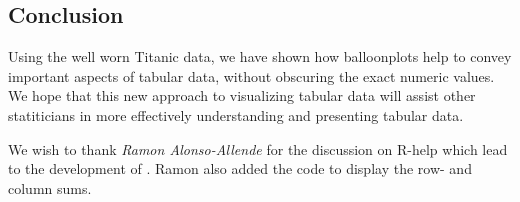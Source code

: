 \documentclass[a4paper]{report}
\begin{document}
\begin{article}
\section*{Conclusion}

Using the well worn Titanic data, we have shown how balloonplots
help to convey important aspects of tabular data, without obscuring
the exact numeric values. We hope that this new approach to
visualizing tabular data will assist other statiticians in more
effectively understanding and presenting tabular data.

We wish to thank \emph{Ramon Alonso-Allende}
 for the discussion on R-help which lead
to the development of . Ramon also added the code
to display the row- and column sums.

\address{Gregory R. Warnes, Pfizer Inc., USA\\
\\
       Nitin Jain, Pfizer Inc., USA\\
}

\end{article}
\end{document}
